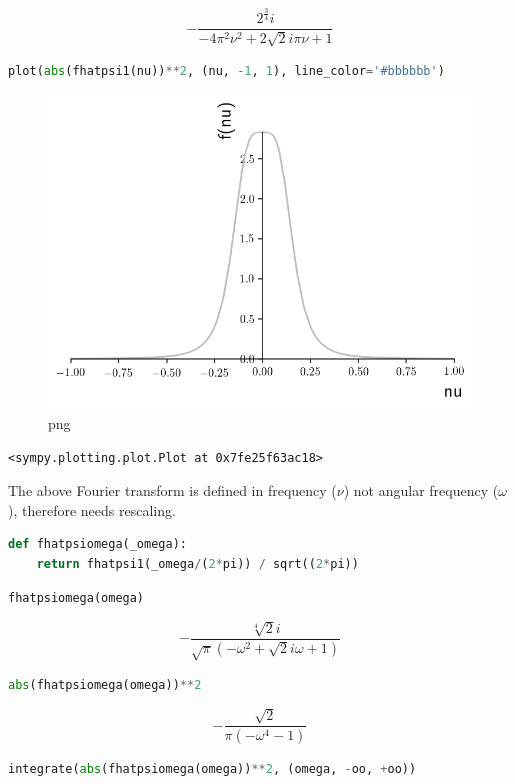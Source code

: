 \[- \frac{2^{\frac{3}{4}} i}{- 4 \pi^{2} \nu^{2} + 2 \sqrt{2} i \pi \nu + 1}\]

\begin{lstlisting}[language=Python]
plot(abs(fhatpsi1(nu))**2, (nu, -1, 1), line_color='#bbbbbb')
\end{lstlisting}

\begin{figure}
\centering
\includegraphics[width=0.6\linewidth]{output_58_0.png}
\caption{png}
\end{figure}

\begin{lstlisting}
<sympy.plotting.plot.Plot at 0x7fe25f63ac18>
\end{lstlisting}

The above Fourier transform is defined in frequency ($\nu$) not angular
frequency ($\omega$), therefore needs rescaling.

\begin{lstlisting}[language=Python]
def fhatpsiomega(_omega):
    return fhatpsi1(_omega/(2*pi)) / sqrt((2*pi))
\end{lstlisting}

\begin{lstlisting}[language=Python]
fhatpsiomega(omega)
\end{lstlisting}

\begin{equation}\label{eq:fhatpsi1_omega}
    - \frac{\sqrt[4]{2} i}{\sqrt{\pi} \left(- \omega^{2} + \sqrt{2} i \omega + 1\right)}
\end{equation}

\begin{lstlisting}[language=Python]
abs(fhatpsiomega(omega))**2
\end{lstlisting}

\[- \frac{\sqrt{2}}{\pi \left(- \omega^{4} - 1\right)}\]

\begin{lstlisting}[language=Python]
integrate(abs(fhatpsiomega(omega))**2, (omega, -oo, +oo))
\end{lstlisting}

